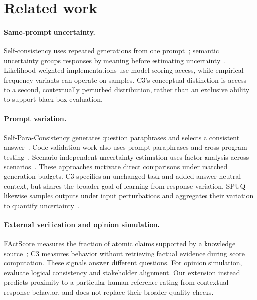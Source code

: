 \documentclass[11pt]{article}
\theoremstyle{plain}
\theoremstyle{definition}
\theoremstyle{remark}
\newif\ifrevisionmarkup
\DeclareRobustCommand{\revisioncolor}{\ifrevisionmarkup\color{red}\fi}
\newenvironment{revision}{\par\begingroup\revisioncolor}{\par\endgroup}
\begin{document}
\begin{revision}
\section{Related work}
\label{Related work}
\paragraph{Same-prompt uncertainty.}
Self-consistency uses repeated generations from one prompt~\citep{DBLP:conf/iclr/0002WSLCNCZ23}; semantic uncertainty groups responses by meaning before estimating uncertainty~\citep{kuhn2023semantic,farquhar2024semantic}. Likelihood-weighted implementations use model scoring access, while empirical-frequency variants can operate on samples. C3's conceptual distinction is access to a second, contextually perturbed distribution, rather than an exclusive ability to support black-box evaluation.

\paragraph{Prompt variation.}
Self-Para-Consistency generates question paraphrases and selects a consistent answer~\citep{chen-etal-2024-self-para}. Code-validation work also uses prompt paraphrases and cross-program testing~\citep{wang2026paraphrasing}. Scenario-independent uncertainty estimation uses factor analysis across scenarios~\citep{wen2025scenario}. These approaches motivate direct comparisons under matched generation budgets. C3 specifies an unchanged task and added answer-neutral context, but shares the broader goal of learning from response variation. SPUQ likewise samples outputs under input perturbations and aggregates their variation to quantify uncertainty~\citep{gao-etal-2024-spuq}.

\paragraph{External verification and opinion simulation.}
FActScore measures the fraction of atomic claims supported by a knowledge source~\citep{min-etal-2023-factscore}; C3 measures behavior without retrieving factual evidence during score computation. These signals answer different questions. For opinion simulation, \citet{neumann2026opinions} evaluate logical consistency and stakeholder alignment. Our extension instead predicts proximity to a particular human-reference rating from contextual response behavior, and does not replace their broader quality checks.
\end{revision}
\end{document}
